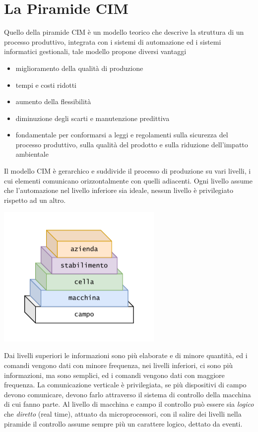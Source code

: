 \documentclass[10pt, letterpaper]{report}
\begin{document}
\section{La Piramide CIM}
Quello della piramide CIM è un modello teorico che descrive la struttura di un processo produttivo, integrata 
con i sistemi di automazione ed i sistemi informatici gestionali, tale modello propone diversi vantaggi\begin{itemize}
    \item miglioramento della qualità di produzione 
    \item tempi e costi ridotti 
    \item aumento della flessibilità 
    \item diminuzione degli scarti e manutenzione predittiva 
    \item fondamentale per conformarsi a leggi e regolamenti sulla 
    sicurezza del processo produttivo, sulla qualità del prodotto e sulla riduzione dell'impatto ambientale
\end{itemize}
Il modello CIM è gerarchico e suddivide il processo di produzione su vari livelli, i cui elementi comunicano 
orizzontalmente con quelli adiacenti. Ogni livello assume che l'automazione nel livello inferiore sia 
ideale, nessun livello è privilegiato rispetto ad un altro.\begin{center}
    \includegraphics[width=0.6\textwidth ]{images/cim.pdf}
\end{center}
Dai livelli superiori le informazioni sono più elaborate e di minore quantità, ed i comandi vengono dati con minore 
frequenza, nei livelli inferiori, ci sono 
più informazioni, ma sono semplici, ed i comandi vengono dati con maggiore 
frequenza. La comunicazione verticale è privilegiata, se più dispositivi di campo devono 
comunicare, devono farlo attraverso il sistema di controllo della macchina di cui fanno parte. \acc 
Al livello di macchina e campo il controllo può essere sia \textit{logico} che \textit{diretto} (real time), 
attuato da microprocessori, con il salire dei livelli nella piramide il controllo assume sempre più un carattere 
logico, dettato da eventi.
\end{document}
